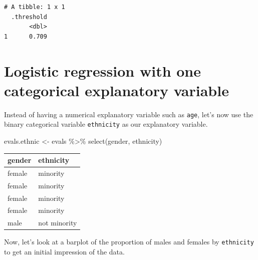 \documentclass[
  letterpaper,
  DIV=11,
  numbers=noendperiod]{scrartcl}
\newenvironment{Shaded}{\begin{snugshade}}{\end{snugshade}}
\newcommand{\FunctionTok}[1]{\textcolor[rgb]{0.28,0.35,0.67}{#1}}
\newcommand{\NormalTok}[1]{\textcolor[rgb]{0.00,0.23,0.31}{#1}}
\newcommand{\OtherTok}[1]{\textcolor[rgb]{0.00,0.23,0.31}{#1}}
\newcommand{\SpecialCharTok}[1]{\textcolor[rgb]{0.37,0.37,0.37}{#1}}
\begin{document}
\begin{tcolorbox}
\begin{verbatim}
# A tibble: 1 x 1
  .threshold
       <dbl>
1      0.709
\end{verbatim}

\end{tcolorbox}

\section{Logistic regression with one categorical explanatory
variable}\label{logistic-regression-with-one-categorical-explanatory-variable}

Instead of having a numerical explanatory variable such as \texttt{age},
let's now use the binary categorical variable \texttt{ethnicity} as our
explanatory variable.

\begin{Shaded}
\begin{Highlighting}[]
\NormalTok{evals.ethnic }\OtherTok{\textless{}{-}}\NormalTok{ evals }\SpecialCharTok{\%\textgreater{}\%}
                  \FunctionTok{select}\NormalTok{(gender, ethnicity)}
\end{Highlighting}
\end{Shaded}

\begin{longtable}[]{@{}ll@{}}
\toprule\noalign{}
gender & ethnicity \\
\midrule\noalign{}
\endhead
\bottomrule\noalign{}
\endlastfoot
female & minority \\
female & minority \\
female & minority \\
female & minority \\
male & not minority \\
\end{longtable}

Now, let's look at a barplot of the proportion of males and females by
\texttt{ethnicity} to get an initial impression of the data.
\end{document}

